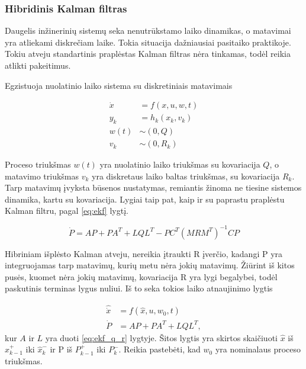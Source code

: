	\subsubsection{Hibridinis Kalman filtras}

	Daugelis inžinerinių sistemų seka nenutrūkstamo laiko dinamikas, o matavimai yra atliekami diskrečiam laike.
	Tokia situacija dažniausiai pasitaiko praktikoje.
	Tokiu atveju standartinis praplėstas Kalman filtras nėra tinkamas, todėl reikia atlikti pakeitimus.

	Egzistuoja nuolatinio laiko sistema su diskretiniais matavimais

    \begin{equation}
    	\begin{aligned}
    		\dot{x} &= f(x,u,w,t) \\
    		y_k &= h_k(x_k, v_k) \\
    		w(t) &\sim (0, Q) \\
            v_k &\sim (0, R_k)
    	\end{aligned}
    \end{equation}

    Proceso triukšmas $w(t)$ yra nuolatinio laiko triukšmas su kovariacija $Q$, o matavimo triukšmas $v_k$ yra diskretaus laiko baltas triukšmas, su kovariacija $R_k$.
    Tarp matavimų įvyksta būsenos nustatymas, remiantis žinoma ne tiesine sistemos dinamika, kartu su kovariacija. Lygiai taip pat, kaip ir su paprastu praplėstu Kalman filtru, pagal \ref{eq:ekf} lygtį.

    \begin{equation}
        \dot{P} = AP + PA^T + LQL^T - PC^T(MRM^T)^{-1}CP
    \end{equation}

    Hibriniam išplėsto Kalman atveju, nereikia įtraukti R įverčio, kadangi P yra integruojamas tarp matavimų, kurių metu nėra jokių matavimų.
    Žiūrint iš kitos pusės, kuomet nėra jokių matavimų, kovariacija R yra lygi begalybei, todėl paskutinis terminas lygus nuliui.
    Iš to seka tokios laiko atnaujinimo lygtis

    \begin{equation}
        \begin{aligned}
            \hat{\dot{x}} &= f(\hat{x}, u, w_0, t) \\
            \dot{P} &= AP + PA^T + LQL^T,
        \end{aligned}
    \end{equation}
    kur $A$ ir $L$ yra duoti \ref{eq:ekf_q_r} lygtyje.
    Šitos lygtis yra skirtos skaičiuoti $\hat{x}$ iš $\hat{x}^+_{k-1}$ iki $\hat{x}^-_k$ ir P iš $P^+_{k-1}$ iki $P^-_k$.
    Reikia pastebėti, kad $w_0$ yra nominalaus proceso triukšmas.

